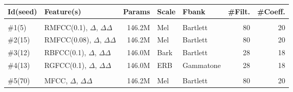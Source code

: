 \begin{table}[H]
    \hspace*{-2.8cm}
\begin{tabular}{ !{\color{ytblborder}\vrule}l!{\color{ytblborder}\vrule}lrllrr| } 
    \hline

    \hline
     \color{white}\bf{Id(seed)} 
    & \color{white}\bf{Feature(s)} 
    & \color{white}\bf{Params} 
    & \color{white}\bf{Scale} 
    & \color{white}\bf{Fbank} 
    & \color{white}\bf{\#Filt.} 
    & \color{white}\bf{\#Coeff.} \\
    \hline

    \hline\hline
       \\
    \hline

    \hline
      \#1(5)  
        & RMFCC(0.1), \(\Delta\), \(\Delta\Delta\) 
        & 146.2M
        & Mel 
        & Bartlett
        & 80 
        & 20 \\
    \hline
    
    \hline
      \#2(15)  
        & RMFCC(0.08), \(\Delta\), \(\Delta\Delta\) 
        & 146.2M
        & Mel 
        & Bartlett
        & 80 
        & 20 \\
    \hline
    
    \hline
      \#3(12)  
        & RBFCC(0.1), \(\Delta\), \(\Delta\Delta\) 
        & 146.0M
        & Bark 
        & Bartlett
        & 28 
        & 18 \\
    \hline

    \hline
      \#4(13)  
        & RGFCC(0.1), \(\Delta\), \(\Delta\Delta\) 
        & 146.0M
        & ERB
        & Gammatone
        & 28 
        & 18 \\
    \hline

    \hline\hline
       \\
    \hline

    \hline
      \#5(70)  
        & MFCC, \(\Delta\), \(\Delta\Delta\) 
        & 146.2M
        & Mel 
        & Bartlett
        & 80 
        & 20 \\
    \hline
    

\end{tabular}
\end{table}
